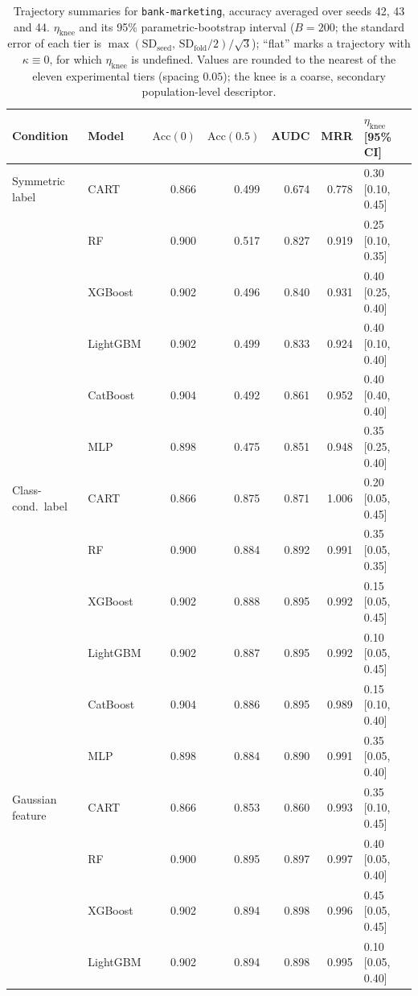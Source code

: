 \documentclass[pdflatex,sn-mathphys]{sn-jnl}
\theoremstyle{thmstyleone}
\begin{document}
\begin{table}[htbp]
\centering
\scriptsize
\setlength{\tabcolsep}{3.5pt}
\caption{Trajectory summaries for \texttt{bank-marketing}, accuracy averaged over seeds 42, 43 and 44. $\eta_{\mathrm{knee}}$ and its 95\% parametric-bootstrap interval ($B=200$; the standard error of each tier is $\max(\mathrm{SD}_{\mathrm{seed}},\,\mathrm{SD}_{\mathrm{fold}}/2)/\sqrt3$); ``flat'' marks a trajectory with $\kappa\equiv 0$, for which $\eta_{\mathrm{knee}}$ is undefined. Values are rounded to the nearest of the eleven experimental tiers (spacing $0.05$); the knee is a coarse, secondary population-level descriptor.}
\label{tab:traj_bank_marketing}
\begin{tabular}{@{}llrrrrl@{}}
\toprule
Condition & Model & $\mathrm{Acc}(0)$ & $\mathrm{Acc}(0.5)$ & AUDC & MRR & $\eta_{\mathrm{knee}}$ [95\% CI] \\
\midrule
Symmetric label & CART & 0.866 & 0.499 & 0.674 & 0.778 & 0.30 [0.10, 0.45] \\
 & RF & 0.900 & 0.517 & 0.827 & 0.919 & 0.25 [0.10, 0.35] \\
 & XGBoost & 0.902 & 0.496 & 0.840 & 0.931 & 0.40 [0.25, 0.40] \\
 & LightGBM & 0.902 & 0.499 & 0.833 & 0.924 & 0.40 [0.10, 0.40] \\
 & CatBoost & 0.904 & 0.492 & 0.861 & 0.952 & 0.40 [0.40, 0.40] \\
 & MLP & 0.898 & 0.475 & 0.851 & 0.948 & 0.35 [0.25, 0.40] \\
\midrule
Class-cond.\ label & CART & 0.866 & 0.875 & 0.871 & 1.006 & 0.20 [0.05, 0.45] \\
 & RF & 0.900 & 0.884 & 0.892 & 0.991 & 0.35 [0.05, 0.35] \\
 & XGBoost & 0.902 & 0.888 & 0.895 & 0.992 & 0.15 [0.05, 0.45] \\
 & LightGBM & 0.902 & 0.887 & 0.895 & 0.992 & 0.10 [0.05, 0.45] \\
 & CatBoost & 0.904 & 0.886 & 0.895 & 0.989 & 0.15 [0.10, 0.40] \\
 & MLP & 0.898 & 0.884 & 0.890 & 0.991 & 0.35 [0.05, 0.40] \\
\midrule
Gaussian feature & CART & 0.866 & 0.853 & 0.860 & 0.993 & 0.35 [0.10, 0.45] \\
 & RF & 0.900 & 0.895 & 0.897 & 0.997 & 0.40 [0.05, 0.40] \\
 & XGBoost & 0.902 & 0.894 & 0.898 & 0.996 & 0.45 [0.05, 0.45] \\
 & LightGBM & 0.902 & 0.894 & 0.898 & 0.995 & 0.10 [0.05, 0.40] \\

\end{tabular}
\end{table}
\end{document}

